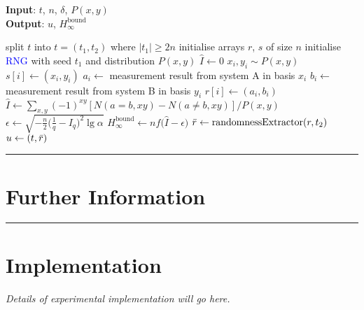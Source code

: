 \documentclass[12pt,letterpaper]{article}
\begin{document}
\hspace*{\algorithmicindent} \textbf{Input}: $t$, $n$, $\delta$, $P(x,y)$ \\
\hspace*{\algorithmicindent} \textbf{Output}: $u$, $H_{\infty}^{\textrm{bound}}$
\begin{algorithmic}[1]
\State split $t$ into $t=(t_1,t_2)$ where $|t_1|\geq2n$
\State initialise arrays $r$, $s$ of size $n$
\State initialise \textcolor{blue}{RNG} with seed $t_1$ and distribution $P(x,y)$ 
\State $\hat{I}\leftarrow0$
    \State $x_i, y_i \sim P(x,y)$
    \State $s[i]\leftarrow(x_i, y_i)$
    \State $a_i\leftarrow$ measurement result from system A in basis $x_i$
    \State $b_i\leftarrow$ measurement result from system B in basis $y_i$
    \State $r[i]\leftarrow(a_i,b_i)$
\EndFor
\State $\hat{I}\leftarrow\sum_{x,y}(-1)^{xy}[N(a=b,xy)-N(a\neq b,xy)]/P(x,y)$
\State $\epsilon\leftarrow\sqrt{-\frac{n}{2}\big(\frac{1}{q}-I_q\big)^2\lg{\alpha}}$
\State $H_{\infty}^{\textrm{bound}}\leftarrow nf\big(\hat{I}-\epsilon\big)$
\State $\Bar{r}\leftarrow\textrm{randomnessExtractor}(r, t_2)$
\State $u\leftarrow(t,\Bar{r})$
\end{algorithmic}

\newpage
\rule{\textwidth}{2pt}
\section*{Further Information}

\rule{\textwidth}{2pt}
\section*{Implementation}

\emph{Details of experimental implementation will go here.}




\end{document}
